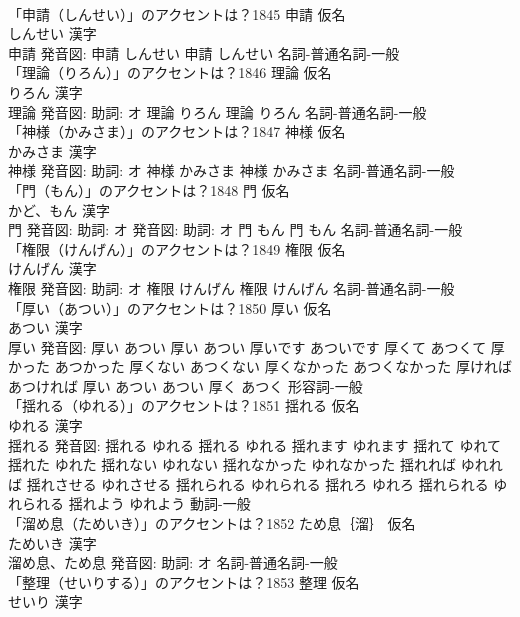 \documentclass[8pt]{extreport}
\begin{document}
\begin{CJK}{UTF8}{min}
\\	「申請（しんせい）」のアクセントは？1845	申請 仮名　
\\	しんせい 漢字　
\\	申請 発音図:	申請 しんせい		申請 しんせい				名詞-普通名詞-一般 
\\	「理論（りろん）」のアクセントは？1846	理論 仮名　
\\	りろん 漢字　
\\	理論 発音図: 助詞: オ	理論 りろん		理論 りろん				名詞-普通名詞-一般 
\\	「神様（かみさま）」のアクセントは？1847	神様 仮名　
\\	かみさま 漢字　
\\	神様 発音図: 助詞: オ	神様 かみさま		神様 かみさま				名詞-普通名詞-一般 
\\	「門（もん）」のアクセントは？1848	門 仮名　
\\	かど、もん 漢字　
\\	門 発音図: 助詞: オ 発音図: 助詞: オ	門 もん		門 もん				名詞-普通名詞-一般 
\\	「権限（けんげん）」のアクセントは？1849	権限 仮名　
\\	けんげん 漢字　
\\	権限 発音図: 助詞: オ	権限 けんげん		権限 けんげん				名詞-普通名詞-一般 
\\	「厚い（あつい）」のアクセントは？1850	厚い 仮名　
\\	あつい 漢字　
\\	厚い 発音図:	厚い あつい		厚い あつい 厚いです あついです 厚くて あつくて 厚かった あつかった 厚くない あつくない 厚くなかった あつくなかった 厚ければ あつければ 厚い あつい あつい 厚く あつく				形容詞-一般 
\\	「揺れる（ゆれる）」のアクセントは？1851	揺れる 仮名　
\\	ゆれる 漢字　
\\	揺れる 発音図:	揺れる ゆれる		揺れる ゆれる 揺れます ゆれます 揺れて ゆれて 揺れた ゆれた 揺れない ゆれない 揺れなかった ゆれなかった 揺れれば ゆれれば 揺れさせる ゆれさせる 揺れられる ゆれられる 揺れろ ゆれろ 揺れられる ゆれられる 揺れよう ゆれよう				動詞-一般 
\\	「溜め息（ためいき）」のアクセントは？1852	ため息｛溜｝ 仮名　
\\	ためいき 漢字　
\\	溜め息、ため息 発音図: 助詞: オ							名詞-普通名詞-一般 
\\	「整理（せいりする）」のアクセントは？1853	整理 仮名　
\\	せいり 漢字　

\end{CJK}
\end{document}
